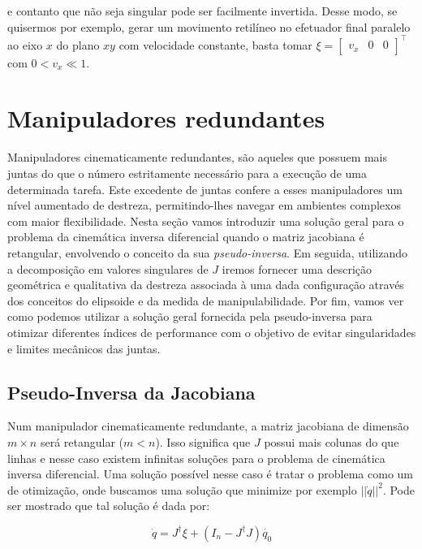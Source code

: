 e contanto que não seja singular pode ser facilmente invertida. Desse modo, se
quisermos por exemplo, gerar um movimento retilíneo no efetuador final paralelo
ao eixo \(x\) do plano \(xy\) com velocidade constante, basta tomar \(\xi = \begin{bmatrix}
    v_x & 0 & 0
\end{bmatrix}^\top\) com \(0 < v_x \ll 1\).

\section{Manipuladores redundantes}

Manipuladores cinematicamente redundantes, são aqueles que possuem mais juntas
do que o número estritamente necessário para a execução de uma determinada
tarefa. Este excedente de juntas confere a esses manipuladores um nível
aumentado de destreza, permitindo-lhes navegar em ambientes complexos com maior
flexibilidade. Nesta seção vamos introduzir uma solução geral para o problema
da cinemática inversa diferencial quando o matriz jacobiana é retangular,
envolvendo o conceito da sua \emph{pseudo-inversa}. Em seguida, utilizando a
decomposição em valores singulares de \(J\) iremos fornecer uma descrição
geométrica e qualitativa da destreza associada à uma dada configuração através
dos conceitos do elipsoide e da medida de manipulabilidade. Por fim, vamos ver
como podemos utilizar a solução geral fornecida pela pseudo-inversa para
otimizar diferentes índices de performance com o objetivo de evitar
singularidades e limites mecânicos das juntas.

\subsection{Pseudo-Inversa da Jacobiana}

Num manipulador cinematicamente redundante, a matriz jacobiana de dimensão \(m
\times n\) será retangular (\(m < n\)). Isso significa que \(J\) possui mais
colunas do que linhas e nesse caso existem infinitas soluções para o problema
de cinemática inversa diferencial. Uma solução possível nesse caso é tratar o
problema como um de otimização, onde buscamos uma solução que minimize por
exemplo \(||\dot{q}||^2\). Pode ser mostrado que tal solução é dada por:

\begin{equation}\label{eq:pseudo-inverse}
    \dot{q} = J^\dag \xi + (I_n - J^\dag J) \dot{q_0}
\end{equation}

